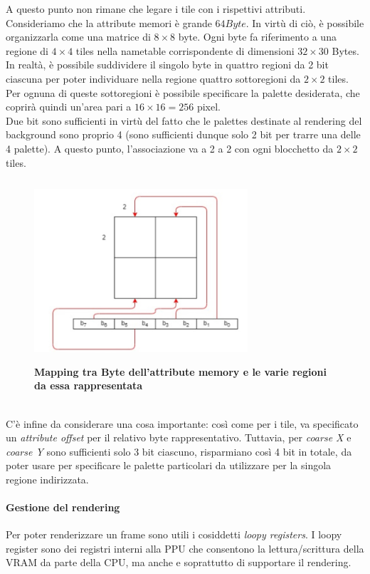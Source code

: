 \documentclass[11pt]{article}
\begin{document}
A questo punto non rimane che legare i tile con i rispettivi attributi. Consideriamo che la attribute memori è grande $64 Byte$. In virtù di ciò, è possibile organizzarla come una matrice di $8\times8$ byte. Ogni byte fa riferimento a una regione di $4\times4$ tiles nella nametable corrispondente di dimensioni $32\times 30$ Bytes. In realtà, è possibile suddividere il singolo byte in quattro regioni da 2 bit ciascuna per poter individuare nella regione quattro sottoregioni da $2\times 2$ tiles. Per ognuna di queste sottoregioni è possibile specificare la palette desiderata, che coprirà quindi un'area pari a $16\times 16=256$ pixel.\\
Due bit sono sufficienti in virtù del fatto che le palettes destinate al rendering del background sono proprio 4 (sono sufficienti dunque solo 2 bit per trarre una delle 4 palette). A questo punto, l'associazione va a 2 a 2 con ogni blocchetto da $2\times 2$ tiles.
\begin{figure}[h]
\centering
\includegraphics[width=300px, height=255px]{ATT_TILE_MAP.jpg}\\
\small\textbf{Mapping tra Byte dell'attribute memory e le varie regioni da essa rappresentata}
\end{figure}\\
C'è infine da considerare una cosa importante: così come per i tile, va specificato un \emph{attribute offset} per il relativo byte rappresentativo. Tuttavia, per \emph{coarse X} e \emph{coarse Y} sono sufficienti solo 3 bit ciascuno, risparmiano così 4 bit in totale, da poter usare per specificare le palette particolari da utilizzare per la singola regione indirizzata.
\paragraph{Gestione del rendering}
Per poter renderizzare un frame sono utili i cosiddetti \emph{loopy registers}. I loopy register sono dei registri interni alla PPU che consentono la lettura/scrittura della VRAM da parte della CPU, ma anche e soprattutto di supportare il rendering.
\end{document}
